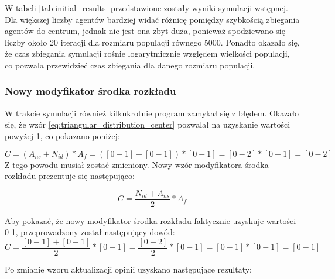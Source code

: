 W tabeli \ref{tab:initial_results} przedstawione zostały wyniki symulacji wstępnej.
Dla większej liczby agentów bardziej widać różnicę pomiędzy szybkością zbiegania agentów do centrum,
jednak nie jest ona zbyt duża, ponieważ spodziewano się liczby około 20 iteracji dla rozmiaru populacji równego 5000.
Ponadto okazało się, że czas zbiegania symulacji rośnie logarytmicznie względem wielkości populacji,
co pozwala przewidzieć czas zbiegania dla danego rozmiaru populacji.


\subsubsection{Nowy modyfikator środka rozkładu}
W trakcie symulacji również kilkukrotnie program zamykał się z błędem.
Okazało się, że wzór \ref{eq:triangular_distribution_center} pozwalał na uzyskanie wartości powyżej 1,
co pokazano poniżej:

\begin{equation}
    C = (A_{ns} + N_{id}) * A_f = ([0-1] + [0-1]) * [0-1] = [0-2] * [0-1] = [0-2]
    \label{eq:triangular_distribution_center_values}
\end{equation}
Z tego powodu musiał zostać zmieniony. Nowy wzór modyfikatora środka rozkładu prezentuje się następująco:

\begin{equation}
    C = \frac{N_{id} + A_{ns}}{2} * A_f
    \label{eq:new_triangular_distribution_center}
\end{equation}

Aby pokazać, że nowy modyfikator środka rozkładu faktycznie uzyskuje wartości 0-1, przeprowadzony został następujący dowód:
\begin{equation}
    C = \frac{[0-1] + [0-1]}{2} * [0-1] = \frac{[0-2]}{2} * [0-1] = [0-1] * [0-1] = [0-1]
    \label{eq:new_triangular_distribution_center_result}
\end{equation}

Po zmianie wzoru aktualizacji opinii uzyskano następujące rezultaty:

